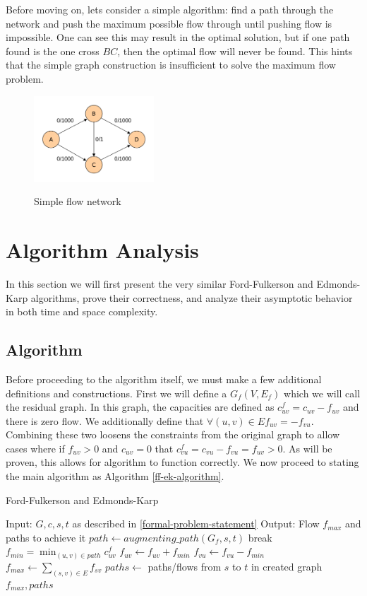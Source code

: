 \documentclass{acm_proc_article-sp}
\begin{document}
Before moving on, lets consider a simple algorithm: find a path through the network and push the maximum possible flow through until pushing flow is impossible. One can see this may result in the optimal solution, but if one path found is the one cross $BC$, then the optimal flow will never be found. This hints that the simple graph construction is insufficient to solve the maximum flow problem.

\begin{figure}[!ht]
	\caption{Simple flow network}
	\centering
	\includegraphics[width=0.4\textwidth]{images/simple-flow.png}
	\label{simple-flow}
\end{figure}

\section{Algorithm Analysis}
In this section we will first present the very similar Ford-Fulkerson and Edmonds-Karp algorithms, prove their correctness, and analyze their asymptotic behavior in both time and space complexity.

\subsection{Algorithm}
Before proceeding to the algorithm itself, we must make a few additional definitions and constructions. First we will define a $G_f(V,E_f)$ which we will call the residual graph. In this graph, the capacities are defined as $c^f_{uv}=c_{uv}-f_{uv}$ and there is zero flow. We additionally define that $\forall (u,v)\in E f_{uv}=-f_{vu}$. Combining these two loosens the constraints from the original graph to allow cases where if $f_{uv}>0$ and $c_{uv}=0$ that $c^f_{vu}=c_{vu}-f_{vu}=f_{uv}>0$. As will be proven, this allows for algorithm to function correctly. We now proceed to stating the main algorithm as Algorithm \ref{ff-ek-algorithm}.

\begin{algorithm}
\label{ff-ek-algorithm}
\caption{Ford-Fulkerson and Edmonds-Karp}
\begin{algorithmic}[1]
\State Input: $G,c,s,t$ as described in \ref{formal-problem-statement}
\State Output: Flow $f_{max}$ and paths to achieve it
\Loop
\State $path\gets augmenting\_path(G_f,s,t)$
\State break
\EndIf
\State $f_{min}=\min_{(u,v)\in path} c^f_{uv}$
\State $f_{uv}\gets f_{uv}+f_{min}$
\State $f_{vu}\gets f_{vu}-f_{min}$
\EndFor
\EndLoop
\State $f_{max}\gets \sum_{(s,v)\in E}f_{sv}$
\State $paths\gets$ paths/flows from $s$ to $t$ in created graph
\State \Return $f_{max},paths$
\EndFunction
\end{algorithmic}
\end{algorithm}
\end{document}
